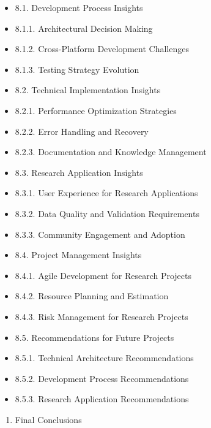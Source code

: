 \documentclass[12pt,a4paper]{report}
\begin{document}
\begin{itemize}
\item 8.1. Development Process Insights
\item 8.1.1. Architectural Decision Making
\item 8.1.2. Cross-Platform Development Challenges
\item 8.1.3. Testing Strategy Evolution
\item 8.2. Technical Implementation Insights
\item 8.2.1. Performance Optimization Strategies
\item 8.2.2. Error Handling and Recovery
\item 8.2.3. Documentation and Knowledge Management
\item 8.3. Research Application Insights
\item 8.3.1. User Experience for Research Applications
\item 8.3.2. Data Quality and Validation Requirements
\item 8.3.3. Community Engagement and Adoption
\item 8.4. Project Management Insights
\item 8.4.1. Agile Development for Research Projects
\item 8.4.2. Resource Planning and Estimation
\item 8.4.3. Risk Management for Research Projects
\item 8.5. Recommendations for Future Projects
\item 8.5.1. Technical Architecture Recommendations
\item 8.5.2. Development Process Recommendations
\item 8.5.3. Research Application Recommendations
\end{itemize}
\begin{enumerate}
\item Final Conclusions
\end{enumerate}
\end{document}
